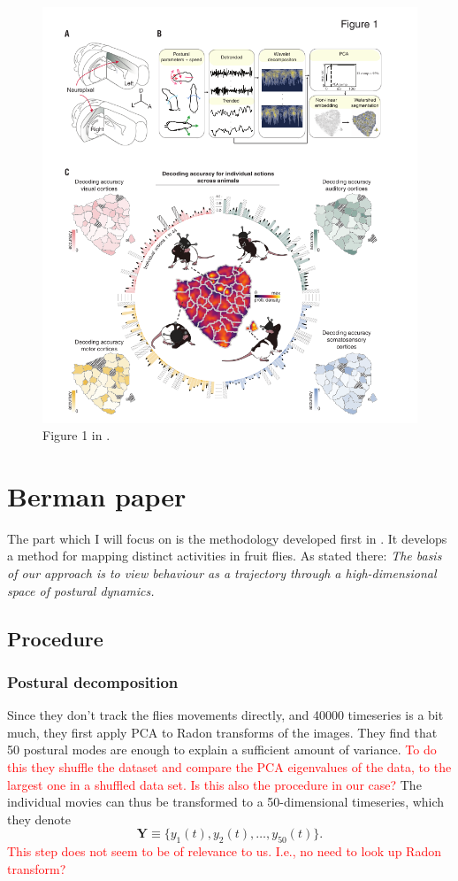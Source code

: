 \documentclass{article}
\theoremstyle{plain}
\theoremstyle{definition}
\theoremstyle{remark}
\begin{document}
\begin{figure}[h]
        \centering
        \includegraphics[width=0.6\linewidth]{./figures/methodology_mimica.png}
        \caption{Figure 1 in \cite{Mimica}.}
        \label{fig:methodology_mimica}
\end{figure}

\section{Berman paper}
The part which I will focus on is the methodology developed first in \cite{Berman}.
It develops a method for mapping distinct activities in fruit flies.
As stated there: \textit{The basis of our approach is to view behaviour as a trajectory through a high-dimensional space of postural dynamics.}

\subsection{Procedure}
\subsubsection{Postural decomposition}
Since they don't track the flies movements directly, and 40000 timeseries is a bit much, they first apply PCA to Radon transforms of the images.
They find that 50 postural modes are enough to explain a sufficient amount of variance.
\textcolor{red}{To do this they shuffle the dataset and compare the PCA eigenvalues of the data, to the largest one in a shuffled data set.
Is this also the procedure in our case?}
The individual movies can thus be transformed to a 50-dimensional timeseries, which they denote
\begin{equation*}
        \mathbf{Y} \equiv \{ y_1(t), y_2(t), \hdots , y_{50}(t) \}.
\end{equation*}
\textcolor{red}{This step does not seem to be of relevance to us.
I.e., no need to look up Radon transform?}
\end{document}
